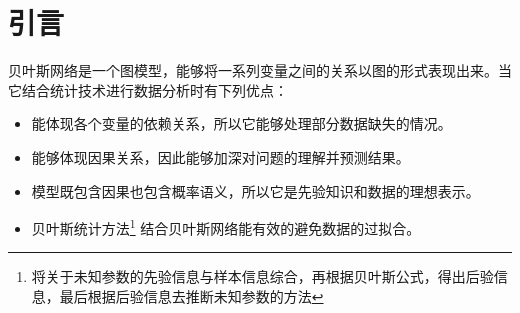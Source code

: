 
\section{引言}
贝叶斯网络是一个图模型，能够将一系列变量之间的关系以图的形式表现出来。当它结合统计技术进行数据分析时有下列优点：
\begin{itemize}
\item 能体现各个变量的依赖关系，所以它能够处理部分数据缺失的情况。
\item 能够体现因果关系，因此能够加深对问题的理解并预测结果。
\item 模型既包含因果也包含概率语义，所以它是先验知识和数据的理想表示。
\item 贝叶斯统计方法\footnote{将关于未知参数的先验信息与样本信息综合，再根据贝叶斯公式，得出后验信息，最后根据后验信息去推断未知参数的方法} 结合贝叶斯网络能有效的避免数据的过拟合\marginpar{\textcolor{red}{\small 怎么就避免过拟合了？}}。
\end{itemize}

